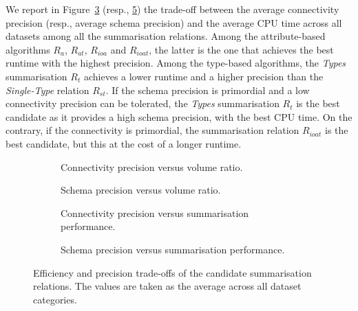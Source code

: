 We report in Figure~\ref{fig:trade-conn-cpu} (resp., \ref{fig:trade-schema-cpu}) the trade-off between the average connectivity precision (resp., average schema precision) and the average CPU time across all datasets among all the summarisation relations. Among the attribute-based algorithms $R_a$, $R_{at}$, $R_{ioa}$ and $R_{ioat}$, the latter is the one that achieves the best runtime with the highest precision. Among the type-based algorithms, the \emph{Types} summarisation $R_t$ achieves a lower runtime and a higher precision than the \emph{Single-Type} relation $R_{st}$.
If the schema precision is primordial and a low connectivity precision can be tolerated, the \emph{Types} summarisation $R_t$ is the best candidate as it provides a high schema precision, with the best CPU time. On the contrary, if the connectivity is primordial, the summarisation relation $R_{ioat}$ is the best candidate, but this at the cost of a longer runtime.

\begin{figure}
	\centering
	\begin{subfigure}[t]{0.46\textwidth}
		\resizebox{\textwidth}{!}{
			
		}
		\caption{Connectivity precision versus volume ratio.}
		\label{fig:trade-conn-volume}
	\end{subfigure}
	\qquad
	\begin{subfigure}[t]{0.46\textwidth}
		\resizebox{\textwidth}{!}{
			
		}
		\caption{Schema precision versus volume ratio.}
		\label{fig:trade-schema-volume}
	\end{subfigure}
	\qquad%
	\begin{subfigure}[t]{0.46\textwidth}
		\resizebox{\textwidth}{!}{
			
		}
		\caption{Connectivity precision versus summarisation performance.}
		\label{fig:trade-conn-cpu}
	\end{subfigure}
	\qquad%
	\begin{subfigure}[t]{0.46\textwidth}
		\resizebox{\textwidth}{!}{
			
		}
		\caption{Schema precision versus summarisation performance.}
		\label{fig:trade-schema-cpu}
	\end{subfigure}
	\caption{Efficiency and precision trade-offs of the candidate summarisation relations. The values are taken as the average across all dataset categories.}
\end{figure}
